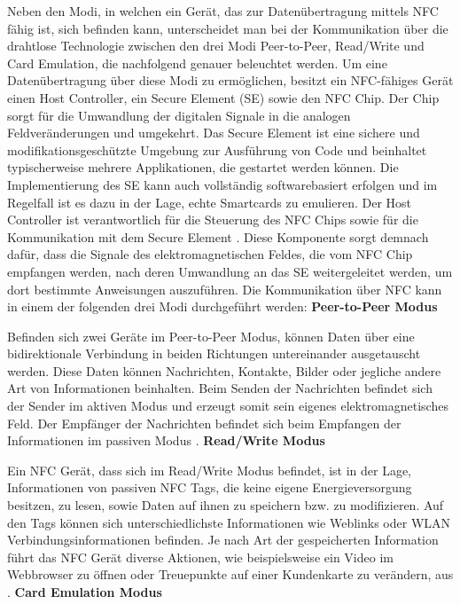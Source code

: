 Neben den Modi, in welchen ein Gerät, das zur Datenübertragung mittels NFC fähig ist, sich befinden kann, unterscheidet man bei der Kommunikation über die drahtlose Technologie zwischen den drei Modi Peer-to-Peer, Read/Write und Card Emulation, die nachfolgend genauer beleuchtet werden. Um eine Datenübertragung über diese Modi zu ermöglichen, besitzt ein NFC-fähiges Gerät einen Host Controller, ein Secure Element (SE) sowie den NFC Chip. Der Chip sorgt für die Umwandlung der digitalen Signale in die analogen Feldveränderungen und umgekehrt. Das Secure Element ist eine sichere und modifikationsgeschützte Umgebung zur Ausführung von Code und beinhaltet typischerweise mehrere Applikationen, die gestartet werden können. Die Implementierung des SE kann auch vollständig softwarebasiert erfolgen und im Regelfall ist es dazu in der Lage, echte Smartcards zu emulieren. 
Der Host Controller ist verantwortlich für die Steuerung des NFC Chips sowie für die Kommunikation mit dem Secure Element \cite{Madlmayr2014}. Diese Komponente sorgt demnach dafür, dass die Signale des elektromagnetischen Feldes, die vom NFC Chip empfangen werden, nach deren Umwandlung an das SE weitergeleitet werden, um dort bestimmte Anweisungen auszuführen. 
\newline
\newline
Die Kommunikation über NFC kann in einem der folgenden drei Modi durchgeführt werden: 
\newline
\newline
\textbf{Peer-to-Peer Modus}

Befinden sich zwei Geräte im Peer-to-Peer Modus, können Daten über eine bidirektionale Verbindung in beiden Richtungen untereinander ausgetauscht werden. Diese Daten können Nachrichten, Kontakte, Bilder oder jegliche andere Art von Informationen beinhalten. Beim Senden der Nachrichten befindet sich der Sender im aktiven Modus und erzeugt somit sein eigenes elektromagnetisches Feld. Der Empfänger der Nachrichten befindet sich beim Empfangen der Informationen im passiven Modus \cite{Madlmayr2014, nfcHealthMonitoring}. 
\newline
\newline
\textbf{Read/Write Modus}

Ein NFC Gerät, dass sich im Read/Write Modus befindet, ist in der Lage, Informationen von passiven NFC Tags, die keine eigene Energieversorgung besitzen, zu lesen, sowie Daten auf ihnen zu speichern bzw. zu modifizieren. Auf den Tags können sich unterschiedlichste Informationen wie Weblinks oder WLAN Verbindungsinformationen befinden. Je nach Art der gespeicherten Information führt das NFC Gerät diverse Aktionen, wie beispielsweise ein Video im Webbrowser zu öffnen oder Treuepunkte auf einer Kundenkarte zu verändern, aus \cite{Madlmayr2014, nfcHealthMonitoring}. 
\newline
\newline
\textbf{Card Emulation Modus}


